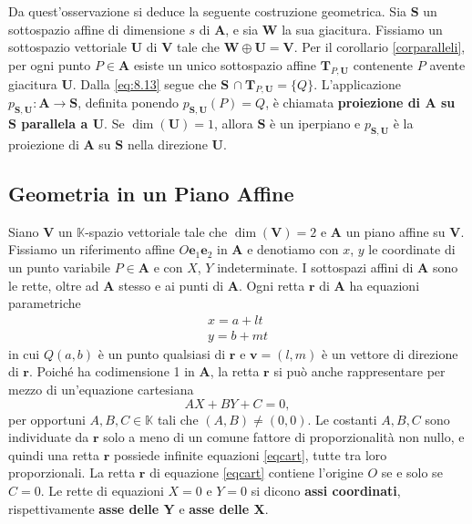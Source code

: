 \documentclass{article}
\theoremstyle{plain}
\theoremstyle{definition}
\theoremstyle{remark}
\begin{document}
\vspace{10pt}

Da quest'osservazione si deduce la seguente costruzione geometrica. Sia $\mathbf{S}$ un sottospazio affine di dimensione $s$ di $\mathbf{A}$, e sia $\mathbf{W}$ la sua giacitura. 
Fissiamo un sottospazio vettoriale $\mathbf{U}$ di $\mathbf{V}$ tale che $\mathbf{W}\oplus \mathbf{U}=\mathbf{V}$. 
Per il corollario \ref{corparalleli}, per ogni punto $P\in \mathbf{A}$ esiste un unico sottospazio affine $\mathbf{T}_{P,\mathbf{U}}$ contenente $P$ avente giacitura $\mathbf{U}$. 
Dalla \eqref{eq:8.13} segue che $\mathbf{S}\,\cap \mathbf{T}_{P,\mathbf{U}}=\{Q\}$. 
L'applicazione $p_{\mathbf{S},\mathbf{U}}:\mathbf{A}\to \mathbf{S}$, definita ponendo $p_{\mathbf{S},\mathbf{U}}(P)=Q$, è chiamata \textbf{proiezione di $\mathbf{A}$ su $\mathbf{S}$ parallela a $\mathbf{U}$}. 
Se $\dim(\mathbf{U})=1$, allora $\mathbf{S}$ è un iperpiano e $p_{\mathbf{S},\mathbf{U}}$ è la proiezione di $\mathbf{A}$ su $\mathbf{S}$ nella direzione $\mathbf{U}$. 

\newpage
\subsection{Geometria in un Piano Affine}
\vspace{20pt}

Siano $\mathbf{V}$ un $\mathbb{K}$-spazio vettoriale tale che $\dim(\mathbf{V}) = 2$ e $\mathbf{A}$ un piano affine su $\mathbf{V}$. 
Fissiamo un riferimento affine $O\mathbf{e}_1\mathbf{e}_2$ in $\mathbf{A}$ e denotiamo con $x$, $y$ le coordinate di un punto variabile $P \in \mathbf{A}$ e con $X$, $Y$ indeterminate. 
I sottospazi affini di $\mathbf{A}$ sono le rette, oltre ad $\mathbf{A}$ stesso e ai punti di $\mathbf{A}$.
Ogni retta $\mathbf{r}$ di $\mathbf{A}$ ha equazioni parametriche
\begin{equation}\label{eqparam}
    \begin{matrix}
        x = a + lt \\
        y = b + mt
    \end{matrix} 
\end{equation}
in cui $Q(a, b)$ è un punto qualsiasi di $\mathbf{r}$ e $\mathbf{v} = (l, m)$ è un vettore di direzione di $\mathbf{r}$. 
Poiché ha codimensione 1 in $\mathbf{A}$, la retta $\mathbf{r}$ si può anche rappresentare per mezzo di un'equazione cartesiana
\begin{equation}\label{eqcart}
AX + BY + C = 0,
\end{equation}
per opportuni $A, B, C \in \mathbb{K}$ tali che $(A, B) \neq (0, 0)$. Le costanti $A, B, C$ sono individuate da $\mathbf{r}$ solo a meno di un comune fattore di proporzionalità non nullo, 
e quindi una retta $\mathbf{r}$ possiede infinite equazioni \ref{eqcart}, tutte tra loro proporzionali. 
La retta $\mathbf{r}$ di equazione \ref{eqcart} contiene l'origine $O$ se e solo se $C = 0$. 
Le rette di equazioni $X = 0$ e $Y = 0$ si dicono \textbf{assi coordinati}, rispettivamente \textbf{asse delle Y} e \textbf{asse delle X}.
\end{document}
